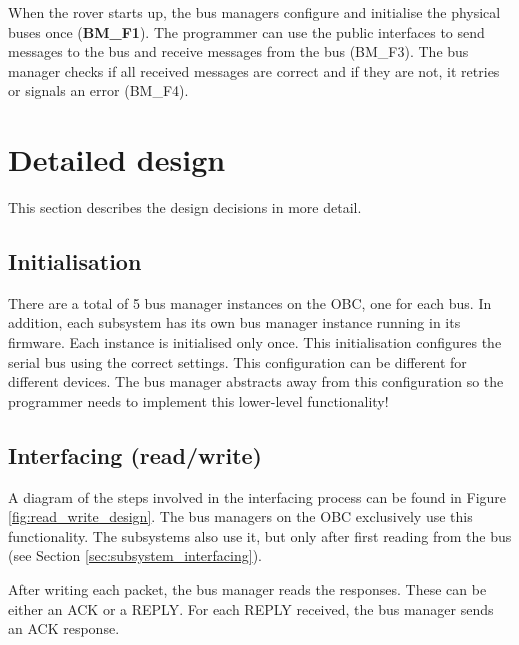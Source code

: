 When the rover starts up, the bus managers configure and initialise the physical buses once (\textbf{BM\_F1}). The programmer can use the public interfaces to send messages to the bus and receive messages from the bus (BM\_F3). The bus manager checks if all received messages are correct and if they are not, it retries or signals an error (BM\_F4).

\section{Detailed design}
This section describes the design decisions in more detail.
\subsection{Initialisation}
\label{sec:initialisation}
There are a total of 5 bus manager instances on the OBC, one for each bus. In addition, each subsystem has its own bus manager instance running in its firmware. Each instance is initialised only once. This initialisation configures the serial bus using the correct settings. This configuration can be different for different devices. The bus manager abstracts away from this configuration so the programmer needs to implement this lower-level functionality!

\subsection{Interfacing (read/write)}
\label{sec:interfacing}
A diagram of the steps involved in the interfacing process can be found in Figure \ref{fig:read_write_design}. The bus managers on the OBC exclusively use this functionality. The subsystems also use it, but only after first reading from the bus (see Section \ref{sec:subsystem_interfacing}).
\par After writing each packet, the bus manager reads the responses. These can be either an ACK or a REPLY. For each REPLY received, the bus manager sends an ACK response.

